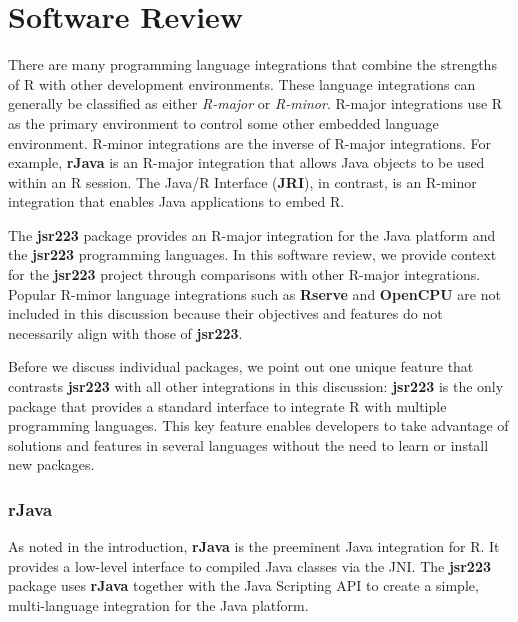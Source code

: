 
\chapter{Software Review}

There are many programming language integrations that combine the strengths of R with other development environments. These language integrations can generally be classified as either \textit{R-major} or \textit{R-minor}. R-major integrations use R as the primary environment to control some other embedded language environment. R-minor integrations are the inverse of R-major integrations. For example, \textbf{rJava} is an R-major integration that allows Java objects to be used within an R session. The Java/R Interface (\textbf{JRI}), in contrast, is an R-minor integration that enables Java applications to embed R.

The \textbf{jsr223} package provides an R-major integration for the Java platform and the \textbf{jsr223} programming languages. In this software review, we provide context for the \textbf{jsr223} project through comparisons with other R-major integrations. Popular R-minor language integrations such as \textbf{Rserve} \citep{rserve} and \textbf{OpenCPU} \citep{opencpu} are not included in this discussion because their objectives and features do not necessarily align with those of \textbf{jsr223}.

Before we discuss individual packages, we point out one unique feature that contrasts \textbf{jsr223} with all other integrations in this discussion: \textbf{jsr223} is the only package that provides a standard interface to integrate R with multiple programming languages. This key feature enables developers to take advantage of solutions and features in several languages without the need to learn or install new packages.

\subsection{\textbf{rJava}}

As noted in the introduction, \textbf{rJava} is the preeminent Java integration for R. It provides a low-level interface to compiled Java classes via the JNI. The \textbf{jsr223} package uses \textbf{rJava} together with the Java Scripting API to create a simple, multi-language integration for the Java platform.

